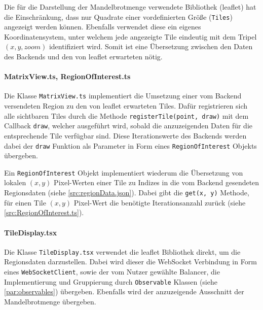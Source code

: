 Die für die Darstellung der Mandelbrotmenge verwendete Bibliothek (leaflet) hat die Einschränkung, dass
nur Quadrate einer vordefinierten Größe (\verb|Tiles|) angezeigt werden können. Ebenfalls verwendet diese ein
eigenes Koordinatensystem, unter welchem jede angezeigte Tile eindeutig mit dem Tripel \( (x, y, zoom) \)
identifiziert wird. Somit ist eine Übersetzung zwischen den Daten des Backends und den von leaflet erwarteten nötig.

\paragraph{MatrixView.ts, RegionOfInterest.ts}\label{par:matrixView}
Die Klasse \verb|MatrixView.ts| implementiert die Umsetzung einer vom Backend versendeten Region zu
den von leaflet erwarteten Tiles. Dafür registrieren sich alle sichtbaren Tiles durch die Methode
\verb|registerTile(point, draw)| mit dem Callback \verb|draw|, welcher ausgeführt wird, sobald die anzuzeigenden Daten für die
entsprechende Tile verfügbar sind. Diese Iterationswerte des Backends werden dabei der \verb|draw| Funktion als Parameter
in Form eines \verb|RegionOfInterest| Objekts übergeben.

Ein \verb|RegionOfInterest| Objekt implementiert wiederum die Übersetzung von lokalen \( (x,y) \) Pixel-Werten
einer Tile zu Indizes in die vom Backend gesendeten Regionsdaten (siehe \autoref{src:regionData.json}). Dabei gibt die
\verb|get(x, y)| Methode, für einen Tile \( (x,y) \) Pixel-Wert die benötigte Iterationsanzahl zurück (siehe \autoref{src:RegionOfInterest.ts}).

\begin{figure}[h!]
	
\end{figure}

\paragraph{TileDisplay.tsx}
Die Klasse \verb|TileDisplay.tsx| verwendet die leaflet Bibliothek direkt, um die Regionsdaten darzustellen.
Dabei wird dieser die WebSocket Verbindung in Form eines \verb|WebSocketClient|, sowie der vom Nutzer gewählte Balancer,
die Implementierung und Gruppierung durch \verb|Observable| Klassen (siehe \autoref{par:observables}) übergeben. Ebenfalls wird der anzuzeigende Ausschnitt der
Mandelbrotmenge übergeben.

